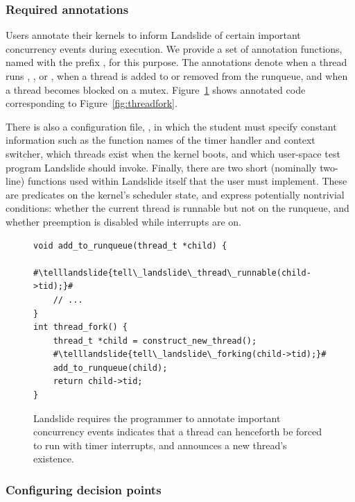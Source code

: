 \subsubsection{Required annotations}
Users annotate their kernels to inform Landslide of certain important concurrency events during execution. We provide a set of annotation functions, named with the prefix , for this purpose. The annotations denote when a thread runs , , or , when a thread is added to or removed from the runqueue, and when a thread becomes blocked on a mutex.
Figure~\ref{fig:annotation} shows annotated code corresponding to Figure~\ref{fig:threadfork}.

There is also a configuration file, , in which the student must specify constant information such as the function names of the timer handler and context switcher, which threads exist when the kernel boots, and which user-space test program Landslide should invoke.
Finally, there are two short (nominally two-line) functions used within Landslide itself that the user must implement. These are predicates on the kernel's scheduler state, and express potentially nontrivial conditions: whether the current thread is runnable but not on the runqueue, and whether preemption is disabled while interrupts are on.

\newcommand\telllandslide[1]{\bfseries \color{violet}{#1}}
\begin{figure}[t]
\small
\begin{lstlisting}
void add_to_runqueue(thread_t *child) {
	#\telllandslide{tell\_landslide\_thread\_runnable(child->tid);}#
	// ...
}
int thread_fork() {
	thread_t *child = construct_new_thread();
	#\telllandslide{tell\_landslide\_forking(child->tid);}#
	add_to_runqueue(child);
	return child->tid;
}
\end{lstlisting}
\caption{Landslide requires the programmer to annotate important concurrency events  indicates that a thread can henceforth be forced to run with timer interrupts, and  announces a new thread's existence.}
\label{fig:annotation}
\end{figure}

\subsubsection{Configuring decision points}
\label{sec:decision}

